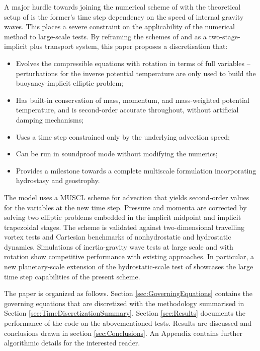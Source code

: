 \documentclass{ametsoc}
\theoremstyle{definition}
\begin{document}
A major hurdle towards joining the numerical scheme of \cite{BenacchioEtAl2014} with the theoretical setup of \cite{KleinBenacchio2016} is the former's time step dependency on the speed of internal gravity waves. This places a severe constraint on the applicability of the numerical method to large-scale tests. By reframing the schemes of \cite{KleinTCFD2009} and \cite{BenacchioEtAl2014} as a two-stage-implicit plus transport system, this paper proposes a discretisation that:
%
\begin{itemize}
\item Evolves the compressible equations with rotation in terms of full variables -- perturbations for the inverse potential temperature are only used to build the buoyancy-implicit elliptic problem;
\item Has built-in conservation of mass, momentum, and mass-weighted potential temperature, and is second-order accurate throughout, without artificial damping mechanisms;
\item Uses a time step constrained only by the underlying advection speed;
\item Can be run in soundproof mode without modifying the numerics;
\item Provides a milestone towards a complete multiscale formulation incorporating hydrostasy and geostrophy.  
\end{itemize}

The model uses a MUSCL scheme for advection that yields second-order values for the variables at the new time step. Pressure and momenta are corrected by solving two elliptic problems embedded in the implicit midpoint and implicit trapezoidal stages. The scheme is validated  against two-dimensional travelling vortex tests and Cartesian benchmarks of nonhydrostatic and hydrostatic dynamics. Simulations of inertia-gravity wave tests at large scale and with rotation show competitive performance with existing approaches. In particular, a new planetary-scale extension of the hydrostatic-scale test of \cite{SkamarockKlemp1994} showcases the large time step capabilities of the present scheme.

The paper is organized as follows. Section \ref{sec:GoverningEquations} contains the governing equations that are discretized with the methodology summarised in Section \ref{sec:TimeDiscretizationSummary}. Section \ref{sec:Results} documents the performance of the code on the abovementioned tests. Results are discussed and conclusions drawn in section \ref{sec:Conclusions}. An Appendix contains further algorithmic details for the interested reader.
\end{document}
